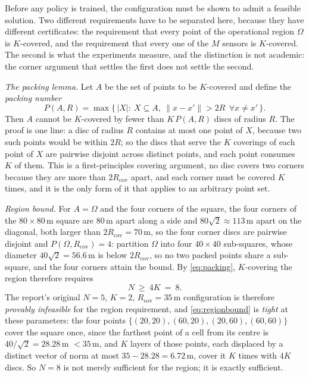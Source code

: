\documentclass[conference]{IEEEtran}
\begin{document}
Before any policy is trained, the configuration must be shown to admit a
feasible solution.  Two different requirements have to be separated here,
because they have different certificates: the requirement that every point
of the operational region $\Omega$ is $K$-covered, and the requirement that
every one of the $M$ sensors is $K$-covered.  The second is what the
experiments measure, and the distinction is not academic: the corner
argument that settles the first does not settle the second.

\emph{The packing lemma.} Let $A$ be the set of points to be $K$-covered and
define the \emph{packing number}
\begin{equation}
P(A,R)=\max\bigl\{\,|X|:\ X\subseteq A,\ \|x-x'\|>2R\ \ \forall x\neq x'\,\bigr\}.
\label{eq:packing}
\end{equation}
Then $A$ cannot be $K$-covered by fewer than $K\,P(A,R)$ discs of radius
$R$.  The proof is one line: a disc of radius $R$ contains at most one
point of $X$, because two such points would be within $2R$; so the discs
that serve the $K$ coverings of each point of $X$ are pairwise disjoint
across distinct points, and each point consumes $K$ of them.  This is a
first-principles covering argument, no disc covers two corners because
they are more than $2R_{\mathrm{cov}}$ apart, and each corner must be
covered $K$ times, and it is the only form of it that applies to an
arbitrary point set.

\emph{Region bound.} For $A=\Omega$ and the four corners of the square,
the four corners of the $80\times80$\,m square are $80$\,m apart along a side and $80\sqrt2\approx113$\,m apart on the diagonal, both larger than $2R_{\mathrm{cov}}=70$\,m, so the four corner discs are pairwise disjoint and $P(\Omega,R_{\mathrm{cov}})=4$: partition $\Omega$ into four $40\times40$ sub-squares, whose diameter $40\sqrt2=56.6$\,m is below $2R_{\mathrm{cov}}$, so no two packed points share a sub-square, and the four corners attain the bound.  By \eqref{eq:packing}, $K$-covering the region therefore requires
\begin{equation}
N\ \ge\ 4K\ =\ 8 .
\label{eq:regionbound}
\end{equation}
The report's original $N=5$, $K=2$, $R_{\mathrm{cov}}=35$\,m configuration
is therefore \emph{provably infeasible} for the region requirement, and
\eqref{eq:regionbound} is \emph{tight} at these parameters: the four points
$\{(20,20),(60,20),(20,60),(60,60)\}$ cover the square once, since the
farthest point of a cell from its centre is $40/\sqrt2=28.28$\,m $<35$\,m,
and $K$ layers of those points, each displaced by a distinct vector of
norm at most $35-28.28=6.72$\,m, cover it $K$ times with $4K$ discs.  So
$N=8$ is not merely sufficient for the region; it is exactly sufficient.
\end{document}
